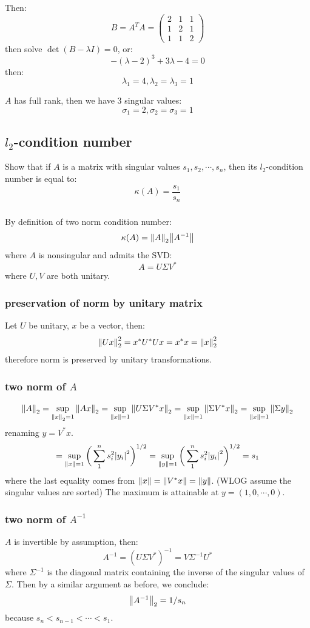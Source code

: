\documentclass[12pt]{article} %
\newcommand{\ka}{\kappa}
\newcommand{\1}[1]{\mathds{1}\left[#1\right]}
\newcommand{\sig}{\sigma}
\begin{document}
Then:
$$
	B = A^TA = 
	\begin{pmatrix}
		2 & 1 & 1\\
		1 & 2 & 1\\
		1 & 1 & 2
	\end{pmatrix}
$$ then solve $\det(B-\lambda I) = 0$, or:
$$
	-(\lambda-2)^3 + 3\lambda - 4 = 0
$$ then:
$$
	\lambda_1 = 4, \lambda_2=\lambda_3 = 1
$$

$A$ has full rank, then we have 3 singular values:
$$
	\sig_1 = 2, \sig_2=\sig_3 = 1
$$


\subsection{$l_2$-condition number}
Show that if $A$ is a matrix with singular values $s_1,s_2,\cdots, s_n$, then its $l_2$-condition number is equal to:
$$
	\ka(A) = \frac{s_1}{s_n}
$$
\subsubsection{}
By definition of two norm condition number:
$$
	\ka(A) = \norm{A}_2\norm{A^{-1}}
$$ where $A$ is nonsingular and admits the SVD:
$$
	A = U\Sigma V^*
$$ where $U,V$ are both unitary. 

\subsubsection{preservation of norm by unitary matrix}
Let $U$ be unitary, $x$ be a vector, then:
$$
	\norm{Ux}_2^2 = x^*U^*Ux = x^*x = \norm{x}_2^2
$$ therefore norm is preserved by unitary transformations.


\subsubsection{two norm of $A$}
$$
	\norm{A}_2 = \sup_{\norm{x}_2 = 1}\norm{Ax}_2 = \sup_{\norm{x}=1}\norm{U\Sigma V^*x}_2 = \sup_{\norm{x}=1}\norm{\Sigma V^*x}_2 = \sup_{\norm{x}=1}\norm{\Sigma y}_2
$$ renaming $y = V^*x$.
$$
	= \sup_{\norm{x}=1}\bigg( 
	\sum_{1}^n s_i^2\abs{y_i}^2
	\bigg)^{1/2} = 
	\sup_{\norm{y}=1}\bigg( 
	\sum_{1}^n s_i^2\abs{y_i}^2
	\bigg)^{1/2} = s_1
$$ where the last equality comes from $\norm{x} = \norm{V^*x} = \norm{y}$. (WLOG assume the singular values are sorted) The maximum is attainable at $y = (1, 0, \cdots, 0)$.

\subsubsection{two norm of $A^{-1}$}
$A$ is invertible by assumption, then:
$$
	A^{-1} = (U\Sigma V^*)^{-1} = V\Sigma^{-1}U^*
$$ where $\Sigma^{-1}$ is the diagonal matrix containing the inverse of the singular values of $\Sigma$. Then by a similar argument as before, we conclude:
$$
	\norm{A^{-1}}_2 = 1/s_n 
$$ because $s_n < s_{n-1} < \cdots < s_1$.
\end{document}
